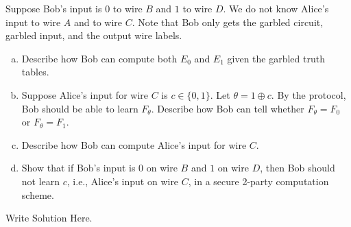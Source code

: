 \documentclass[12pt]{hw}
\begin{document}
\begin{exercise}
Suppose Bob's input is $0$ to wire $B$ and $1$ to wire $D$. We do not know Alice's input to wire $A$ and to wire $C$. Note that Bob only gets the garbled circuit, garbled input, and the output wire labels.
\begin{enumerate}[(a)]
    \item Describe how Bob can compute both $E_0$ and $E_1$ given the garbled truth tables.

    \item Suppose Alice's input for wire $C$ is $c\in\{0,1\}$. Let $\theta = 1 \oplus c$. By the protocol, Bob should be able to learn $F_{\theta}$. Describe how Bob can tell whether $F_{\theta} = F_0$ or $F_{\theta} = F_1$.

    \item Describe how Bob can compute Alice's input for wire $C$.

    \item Show that if Bob's input is $0$ on wire $B$ and $1$ on wire $D$, 
then Bob should not learn $c$, i.e., Alice's input on wire $C$,
in a secure 2-party computation scheme. 

\end{enumerate}
\end{exercise}

\begin{answer} 
Write Solution Here.
\end{answer}
\end{document}
